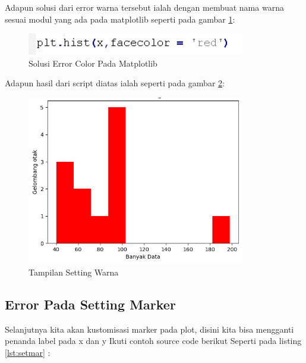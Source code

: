 Adapun solusi dari error warna tersebut ialah dengan membuat nama warna sesuai modul yang ada pada matplotlib seperti pada gambar \ref{fig:solwa}:
\begin{figure}[!htbp]
	\centerline{\includegraphics[width=0.85\textwidth]{figures/6/solwa.PNG}}
	\caption{Solusi Error Color Pada Matplotlib}
	\label{fig:solwa}
\end{figure}   

Adapun hasil dari script diatas ialah seperti pada gambar \ref{fig:showclr}:
\begin{figure}[!htbp]
	\centerline{\includegraphics[width=0.85\textwidth]{figures/6/showclr.PNG}}
	\caption{Tampilan Setting Warna}
	\label{fig:showclr}
\end{figure}   

\subsection{Error Pada Setting Marker}
Selanjutnya kita akan kustomisasi marker pada plot, disini kita bisa mengganti penanda label pada x dan y
Ikuti contoh source code berikut Seperti pada listing \ref{lst:setmar} : 


